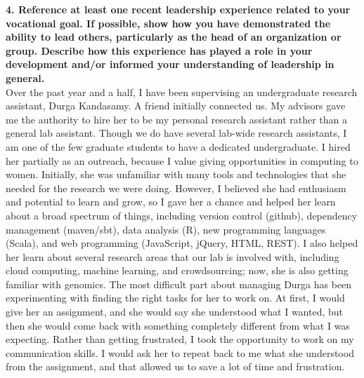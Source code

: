 \documentclass{article}
\begin{document}
\pagestyle{plain}

\noindent\textbf{4.  Reference at least one recent leadership experience related to your vocational goal. If possible, show how you have demonstrated the ability to lead others, particularly as the head of an organization or group. Describe how this experience has played a role in your development and/or informed your understanding of leadership in general.}\\

Over the past year and a half, I have been supervising an undergraduate research assistant, Durga Kandasamy.  
A friend initially connected us.
My advisors gave me the authority to hire her to be my personal research assistant rather than a general lab assistant.  Though we do have several lab-wide research assistants, I am one of the few graduate students to have a dedicated undergraduate.
I hired her partially as an outreach, because I value giving opportunities in computing to women.
Initially, she was unfamiliar with many tools and technologies that she needed for the research we were doing.
However, I believed she had enthusiasm and potential to learn and grow, so I gave her a chance and helped her learn about a broad spectrum of things, including version control (github), dependency management (maven/sbt), data analysis (R), new programming languages (Scala), and web programming (JavaScript, jQuery, HTML, REST).
I also helped her learn about several research areas that our lab is involved with, including cloud computing, machine learning, and crowdsourcing; now, she is also getting familiar with genomics.
The most difficult part about managing Durga has been experimenting with finding the right tasks for her to work on.
At first, I would give her an assignment, and she would say she understood what I wanted, but then she would come back with something completely different from what I was expecting.
Rather than getting frustrated, I took the opportunity to work on my communication skills.
I would ask her to repeat back to me what she understood from the assignment, and that allowed us to save a lot of time and frustration.
\end{document}
